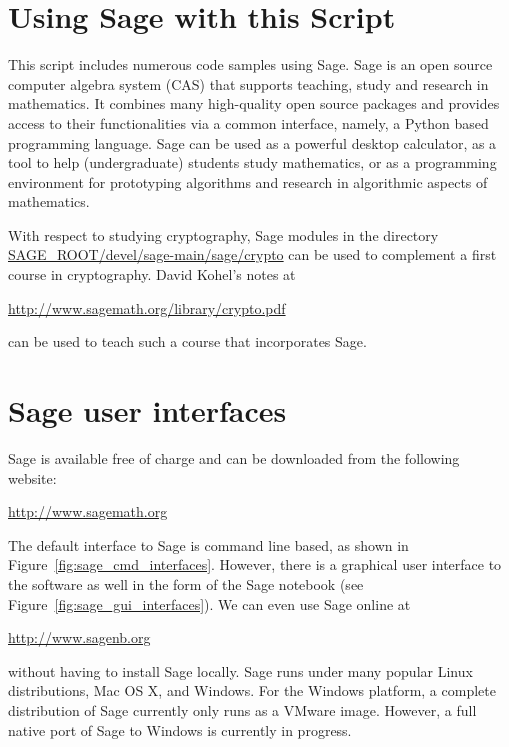 \newpage
\hypertarget{appendix-using-sage}{}
\section{Using Sage with this Script}
\label{s:appendix-using-sage}

This script includes numerous code samples using Sage. Sage is an open
source computer algebra system (CAS) that supports teaching, study and
research in mathematics.  It combines many high-quality open
source packages and provides access to their functionalities via a
common interface, namely, a Python based programming language.  Sage
can be used as a powerful desktop calculator, as a tool to help
(undergraduate) students study mathematics, or as a programming
environment for prototyping algorithms and research in algorithmic
aspects of mathematics.

With respect to studying cryptography, Sage modules in the directory
\url{SAGE_ROOT/devel/sage-main/sage/crypto} can be used to complement
a first course in cryptography.  David Kohel's notes at
\begin{center}
  \url{http://www.sagemath.org/library/crypto.pdf}
\end{center}
can be used to teach such a course that incorporates Sage.


\section*{Sage user interfaces}
Sage is available free of charge and can be downloaded from the
following website:
\begin{center}
  \url{http://www.sagemath.org} \\
\end{center}
The default interface to Sage is command line based, as shown in
Figure~\ref{fig:sage_cmd_interfaces}. However, there is a
graphical user interface to the software as well in the form of the
Sage notebook (see Figure~\ref{fig:sage_gui_interfaces}). We can even
use Sage online at
\begin{center}
\url{http://www.sagenb.org}
\end{center}
without having to install Sage locally. Sage runs under many popular
Linux distributions, Mac OS X, and Windows. For the Windows platform,
a complete distribution of Sage currently only runs as a VMware
image. However, a full native port of Sage to Windows is currently in
progress.

